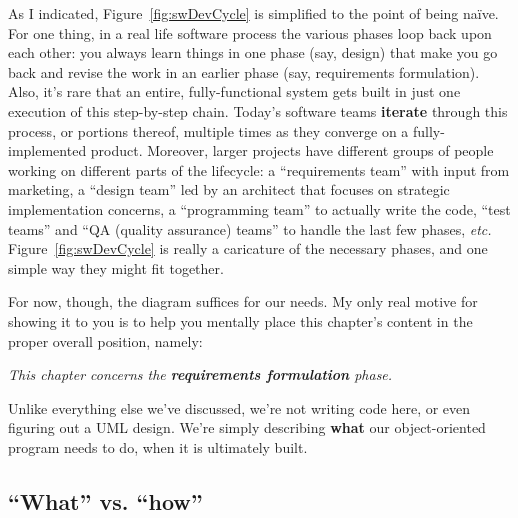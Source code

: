 As I indicated, Figure~\ref{fig:swDevCycle} is simplified to the point of
being na\"{i}ve. For one thing, in a real life software process the various
phases loop back upon each other: you always learn things in one phase (say,
design) that make you go back and revise the work in an earlier phase (say,
requirements formulation). Also, it's rare that an entire, fully-functional
system gets built in just one execution of this step-by-step chain. Today's
software teams \textbf{iterate} through this process, or portions thereof,
multiple times as they converge on a fully-implemented product. Moreover,
larger projects have different groups of people working on different parts of
the lifecycle: a ``requirements team'' with input from marketing, a ``design
team'' led by an architect that focuses on strategic implementation concerns,
a ``programming team'' to actually write the code, ``test teams'' and ``QA
(quality assurance) teams'' to handle the last few phases, \textit{etc.}
Figure~\ref{fig:swDevCycle} is really a caricature of the necessary phases,
and one simple way they might fit together.

For now, though, the diagram suffices for our needs. My only real motive for
showing it to you is to help you mentally place this chapter's content in the
proper overall position, namely:

\vspace{-.15in}
\begin{center}
\textit{This chapter concerns the \textbf{requirements formulation} phase.}
\end{center}
\vspace{-.15in}

Unlike everything else we've discussed, we're not writing code here, or even
figuring out a UML design. We're simply describing \textbf{what} our
object-oriented program needs to do, when it is ultimately built.

\subsection{``What'' vs. ``how''}

